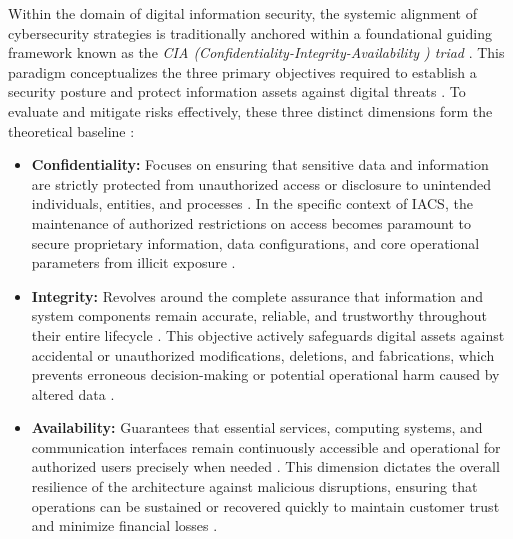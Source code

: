 Within the domain of digital information security, the systemic alignment of cybersecurity strategies is traditionally anchored within a foundational guiding framework known as the \textit{CIA (Confidentiality-Integrity-Availability ) triad} \cite{CIAtriadEICTA2026} \cite[p. 1]{app16126260}. This paradigm conceptualizes the three primary objectives required to establish a security posture and protect information assets against digital threats \cite[p. 5]{Khanna2024}. To evaluate and mitigate risks effectively, these three distinct dimensions form the theoretical baseline \cite[p. 24]{app16126260}:

\begin{itemize}
	\item \textbf{Confidentiality:} Focuses on ensuring that sensitive data and information are strictly protected from unauthorized access or disclosure to unintended individuals, entities, and processes \cite[p. 4]{Khanna2024} \cite[p. 3]{app16126260}. In the specific context of IACS, the maintenance of authorized restrictions on access becomes paramount to secure proprietary information, data configurations, and core operational parameters from illicit exposure \cite[p. 23]{IEC62443-3-3}.
	\item \textbf{Integrity:} Revolves around the complete assurance that information and system components remain accurate, reliable, and trustworthy throughout their entire lifecycle \cite[p. 4]{Khanna2024} \cite[p. 3]{app16126260}. This objective actively safeguards digital assets against accidental or unauthorized modifications, deletions, and fabrications, which prevents erroneous decision-making or potential operational harm caused by altered data \cite[pp. 4]{Khanna2024}.
	\item \textbf{Availability:} Guarantees that essential services, computing systems, and communication interfaces remain continuously accessible and operational for authorized users precisely when needed \cite[pp. 4]{Khanna2024} \cite[p. 3]{app16126260}. This dimension dictates the overall resilience of the architecture against malicious disruptions, ensuring that operations can be sustained or recovered quickly to maintain customer trust and minimize financial losses \cite[p. 5]{Khanna2024}.
\end{itemize}


